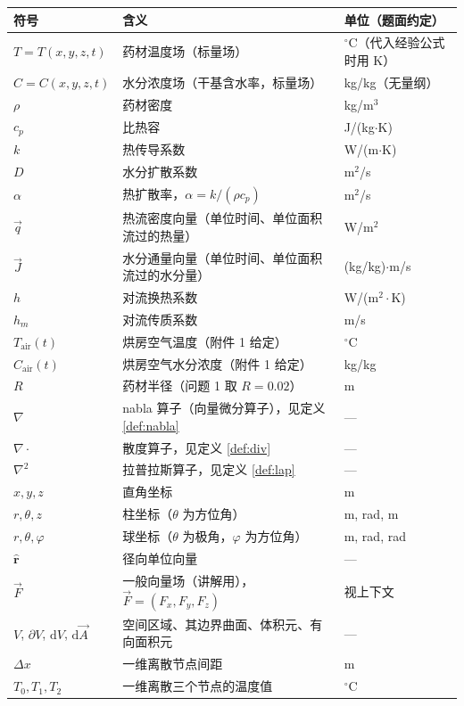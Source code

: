 \documentclass[12pt,a4paper]{ctexart}
\begin{document}
\begin{center}
\begin{tabular}{lll}
\toprule
符号 & 含义 & 单位（题面约定） \\
\midrule
$T=T(x,y,z,t)$ & 药材温度场（标量场） & $^\circ$C（代入经验公式时用 K） \\
$C=C(x,y,z,t)$ & 水分浓度场（干基含水率，标量场） & kg/kg（无量纲） \\
$\rho$ & 药材密度 & kg/m$^3$ \\
$c_p$ & 比热容 & J/(kg$\cdot$K) \\
$k$ & 热传导系数 & W/(m$\cdot$K) \\
$D$ & 水分扩散系数 & m$^2$/s \\
$\alpha$ & 热扩散率，$\alpha=k/(\rho c_p)$ & m$^2$/s \\
$\vec{q}$ & 热流密度向量（单位时间、单位面积流过的热量） & W/m$^2$ \\
$\vec{J}$ & 水分通量向量（单位时间、单位面积流过的水分量） & (kg/kg)$\cdot$m/s \\
$h$ & 对流换热系数 & W/(m$^2\cdot$K) \\
$h_m$ & 对流传质系数 & m/s \\
$T_{\mathrm{air}}(t)$ & 烘房空气温度（附件 1 给定） & $^\circ$C \\
$C_{\mathrm{air}}(t)$ & 烘房空气水分浓度（附件 1 给定） & kg/kg \\
$R$ & 药材半径（问题 1 取 $R=0.02$） & m \\
$\nabla$ & nabla 算子（向量微分算子），见定义 \ref{def:nabla} & --- \\
$\nabla\cdot$ & 散度算子，见定义 \ref{def:div} & --- \\
$\nabla^2$ & 拉普拉斯算子，见定义 \ref{def:lap} & --- \\
$x,y,z$ & 直角坐标 & m \\
$r,\theta,z$ & 柱坐标（$\theta$ 为方位角） & m, rad, m \\
$r,\theta,\varphi$ & 球坐标（$\theta$ 为极角，$\varphi$ 为方位角） & m, rad, rad \\
$\hat{\boldsymbol r}$ & 径向单位向量 & --- \\
$\vec{F}$ & 一般向量场（讲解用），$\vec{F}=(F_x,F_y,F_z)$ & 视上下文 \\
$V$, $\partial V$, $\mathrm{d}V$, $\mathrm{d}\vec{A}$ & 空间区域、其边界曲面、体积元、有向面积元 & --- \\
$\Delta x$ & 一维离散节点间距 & m \\
$T_0,T_1,T_2$ & 一维离散三个节点的温度值 & $^\circ$C \\
\bottomrule
\end{tabular}
\end{center}
\end{document}
